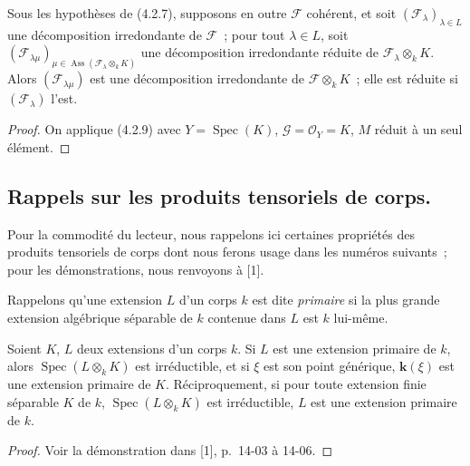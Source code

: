 \begin{corollary}[4.2.10]
\label{IV.2.4.2.10-fr}
Sous les hypothèses de \textup{(4.2.7)}, supposons en outre $\mathcal F$ cohérent, et
soit $(\mathcal F_\lambda)_{\lambda\in L}$ une décomposition irredondante de
$\mathcal F$~; pour tout $\lambda\in L$, soit
$(\mathcal F_{\lambda\mu})_{\mu\in
\operatorname{Ass}(\mathcal F_\lambda\otimes_k K)}$ une décomposition
irredondante réduite de $\mathcal F_\lambda\otimes_k K$. Alors
$(\mathcal F_{\lambda\mu})$ est une décomposition irredondante de
$\mathcal F\otimes_k K$~; elle est réduite si $(\mathcal F_\lambda)$ l'est.
\end{corollary}

\begin{proof}
On applique (4.2.9) avec $Y=\operatorname{Spec}(K)$,
$\mathcal G=\mathcal O_Y=K$, $M$ réduit à un seul élément.
\end{proof}


\subsection{Rappels sur les produits tensoriels de corps.}
\label{subsection:IV.2.4.3-fr}

Pour la commodité du lecteur, nous rappelons ici certaines propriétés des
produits tensoriels de corps dont nous ferons usage dans les numéros suivants~;
pour les démonstrations, nous renvoyons à [1].

\begin{env}[4.3.1]
\label{IV.2.4.3.1-fr}
Rappelons qu'une extension $L$ d'un corps $k$ est dite \emph{primaire} si la
plus grande extension algébrique séparable de $k$ contenue dans $L$ est
$k$ lui-même.
\end{env}

\begin{proposition}[4.3.2]
\label{IV.2.4.3.2-fr}
Soient $K$, $L$ deux extensions d'un corps $k$. Si $L$ est une extension
primaire de $k$, alors $\operatorname{Spec}(L\otimes_k K)$ est irréductible,
et si $\xi$ est son point générique, $\boldsymbol{k}(\xi)$ est une extension primaire de
$K$. Réciproquement, si pour toute extension finie séparable $K$ de $k$,
$\operatorname{Spec}(L\otimes_k K)$ est irréductible, $L$ est une extension
primaire de $k$.
\end{proposition}

\begin{proof}
Voir la démonstration dans [1], p.~14-03 à 14-06.
\end{proof}


